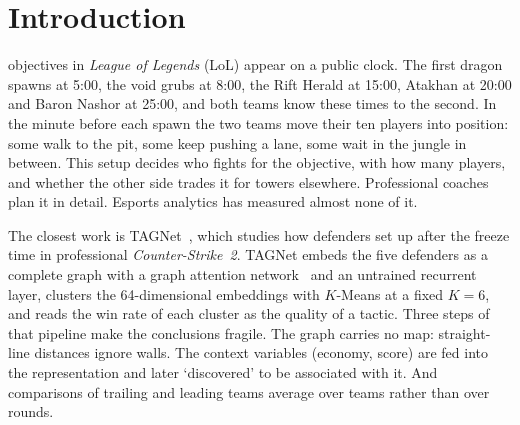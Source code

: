 \section{Introduction}
\label{sec:intro}


 objectives in \emph{League of Legends} (LoL) appear on a public clock.
The first dragon spawns at 5:00, the void grubs at 8:00, the Rift Herald at 15:00, Atakhan at 20:00 and Baron Nashor at 25:00, and both teams know these times to the second.
In the minute before each spawn the two teams move their ten players into position: some walk to the pit, some keep pushing a lane, some wait in the jungle in between.
This setup decides who fights for the objective, with how many players, and whether the other side trades it for towers elsewhere.
Professional coaches plan it in detail. Esports analytics has measured almost none of it.

The closest work is TAGNet~\cite{zhang2026tagnet}, which studies how defenders set up after the freeze time in professional \emph{Counter-Strike~2}.
TAGNet embeds the five defenders as a complete graph with a graph attention network~\cite{velickovic2018graph} and an untrained recurrent layer, clusters the 64-dimensional embeddings with $K$-Means at a fixed $K=6$, and reads the win rate of each cluster as the quality of a tactic.
Three steps of that pipeline make the conclusions fragile.
The graph carries no map: straight-line distances ignore walls.
The context variables (economy, score) are fed into the representation and later `discovered' to be associated with it.
And comparisons of trailing and leading teams average over teams rather than over rounds.

